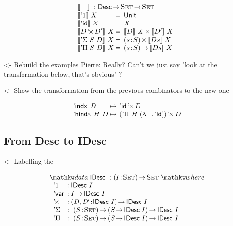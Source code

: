\documentclass[preprint, authoryear]{sigplanconf}
\newenvironment{structure}{\footnotesize\verbatim}{\endverbatim}
\begin{document}
\[\stk{
\descop{\_\:}{} : \Desc \To \Set \To \Set \\
\begin{array}{@{}l@{\:=\:\:}ll}
\descop{\DUnit}{X}        &  \Unit                                       \\
\descop{\DId}{X}          &  X                                           \\
\descop{\DProd{D}{D'}}{X} &  \TIMES{\descop{D}{X}}{\descop{D'}{X}}       \\
\descop{\DSigma{S}{D}}{X} &  \SIGMA{\V{s}}{S} \descop{D s}{X}                \\
\descop{\DPi{S}{D}}{X}    &  \PI{\V{s}}{S} \descop{D s}{X}            
\end{array}
}\]

\begin{structure}
<- Rebuild the examples
Pierre: Really? Can't we just say "look at the transformation below, that's obvious" ?
\end{structure}

\begin{structure}
<- Show the transformation from the previous combinators to the new one
\end{structure}

\[\begin{array}{l@{\:\mapsto\:\:}l}
\DIndx{D}         & \DProd{\DId}{D}                      \\
\DHindx{H}{D}     & \DProd{(\DPi{H}{(\LAM{\_} \DId)})}{D}
\end{array}
\]


\subsection{From Desc to IDesc}

\begin{structure}
<- Labelling the \DId
\end{structure}

\[
\stk{
\data \IDesc{} : \PI{\V{I}}{\Set}{\Set} \where \\
\;\;\begin{array}{@{}l@{\::\:}l@{\quad}l}
    \DUnit          & \IDesc{I}                                         \\
    \DVar           & I \To \IDesc{I}                                   \\
    \DProd{}{}      & \PI{\V{D}, \V{D'}}{\IDesc{I}} \IDesc{I}           \\
    \DSigma         & \PI{\V{S}}{\Set} \PIS{S \To \IDesc{I}} \IDesc{I}  \\
    \DPi            & \PI{\V{S}}{\Set} \PIS{S \To \IDesc{I}} \IDesc{I} 
\end{array}
}
\]
\end{document}
